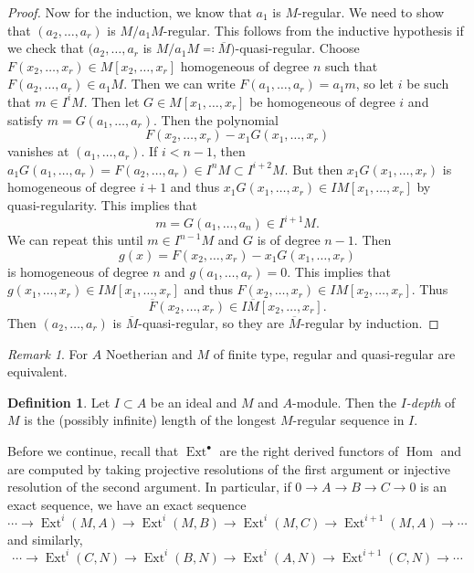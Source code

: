 \documentclass[leqno, openany]{memoir}
\theoremstyle{definition}
\newtheorem{defn}[thm]{Definition}
\theoremstyle{remark}
\newtheorem{rmk}[thm]{Remark}
\theoremstyle{plain}
\theoremstyle{definition}
\theoremstyle{remark}
\newcommand{\ol}[1]{\overline{#1}}
\DeclareMathOperator{\Hom}{Hom}
\DeclareMathOperator{\Ext}{Ext}
\begin{document}
\begin{proof}
    Now for the induction, we know that $a_1$ is $M$-regular. We need to show
    that $(a_2, \ldots, a_r)$ is $M/a_1 M$-regular. This follows from the
    inductive hypothesis if we check that $(a_2, \ldots, a_r$ is $M/a_1 M
    \eqqcolon \ol{M})$-quasi-regular. Choose $F(x_2, \ldots, x_r) \in M[x_2,
    \ldots, x_r]$ homogeneous of degree $n$ such that $F(a_2, \ldots, a_r) \in
    a_1 M$. Then we can write $F(a_1, \ldots, a_r) = a_1 m$, so let $i$ be such
    that $m \in I^i M$. Then let $G \in M[x_1, \ldots, x_r]$ be homogeneous of
    degree $i$ and satisfy $m = G(a_1, \ldots, a_r)$. Then the polynomial \[
    F(x_2, \ldots, x_r) - x_1 G(x_1, \ldots, x_r) \] vanishes at $(a_1, \ldots,
    a_r)$. If $i < n-1$, then $a_1 G(a_1, \ldots, a_r) = F(a_2, \ldots, a_r)
    \in I^n M \subset I^{i+2} M$. But then $x_1 G(x_1, \ldots, x_r)$ is
    homogeneous of degree $i+1$ and thus $x_1 G(x_1, \ldots, x_r) \in IM[x_1,
    \ldots, x_r]$ by quasi-regularity. This implies that \[ m = G(a_1, \ldots,
        a_n) \in I^{i+1}M. \] We can repeat this until $m \in I^{n-1}M$ and $G$
        is of degree $n-1$. Then \[ g(x) = F(x_2, \ldots, x_r) - x_1 G(x_1,
        \ldots, x_r) \] is homogeneous of degree $n$ and $g(a_1, \ldots, a_r) =
        0$. This implies that $g(x_1, \ldots, x_r) \in IM[x_1, \ldots, x_r]$
        and thus $F(x_2, \ldots, x_r) \in IM[x_2, \ldots, x_r]$. Thus \[
        \ol{F}(x_2, \ldots, x_r) \in I \ol{M}[x_2, \ldots, x_r]. \] Then $(a_2,
    \ldots, a_r)$ is $\ol{M}$-quasi-regular, so they are $\ol{M}$-regular by
induction.  \end{proof}

\begin{rmk} For $A$ Noetherian and $M$ of finite type, regular and
quasi-regular are equivalent.  \end{rmk}

\begin{defn} Let $I \subset A$ be an ideal and $M$ and $A$-module. Then the
\textit{$I$-depth} of $M$ is the (possibly infinite) length of the longest
$M$-regular sequence in $I$.  \end{defn}

Before we continue, recall that $\Ext^{\bullet}$ are the right derived functors
of $\Hom$ and are computed by taking projective resolutions of the first
argument or injective resolution of the second argument. In particular, if $0
\to A \to B \to C \to 0$ is an exact sequence, we have an exact sequence \[
\cdots \to \Ext^i(M, A) \to \Ext^i(M, B) \to \Ext^i(M, C) \to \Ext^{i+1}(M,A)
\to \cdots \] and similarly, \[ \cdots \to \Ext^i(C,N) \to \Ext^i(B,N) \to
\Ext^i(A,N) \to \Ext^{i+1}(C,N) \to \cdots \]
\end{document}
